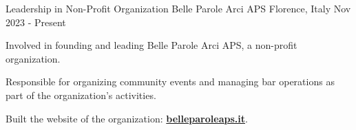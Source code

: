 

\begin{cventries}


  \cventry
    {Leadership in Non-Profit Organization} %
    {Belle Parole Arci APS} %
    {Florence, Italy} %
    {Nov 2023 - Present} %
    {
      \begin{cvitems} %
        \item {Involved in founding and leading Belle Parole Arci APS, a non-profit organization.}
        \item {Responsible for organizing community events and managing bar operations as part of the organization's activities.}
        \item{Built the website of the organization: \href{http://belleparoleaps.it}{\textbf{belleparoleaps.it}}}.
      \end{cvitems}
    }



\end{cventries}
